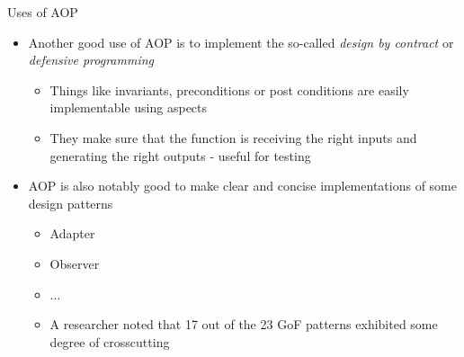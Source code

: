 \documentclass[11pt]{beamer}
\begin{document}
\begin{frame}{Uses of AOP}
\begin{itemize}
   \item Another good use of AOP is to implement the so-called \emph{design by contract} or \emph{defensive programming}
   \begin{itemize}
      \item Things like invariants, preconditions or post conditions are easily implementable using aspects
      \item They make sure that the function is receiving the right inputs and generating the right outputs - useful for testing
   \end{itemize}
   \item AOP is also notably good to make clear and concise implementations of some design patterns
      \begin{itemize}
         \item Adapter
         \item Observer
         \item ...
         \item A researcher noted that 17 out of the 23 GoF patterns exhibited some degree of crosscutting %
      \end{itemize}
\end{itemize}
\end{frame}
\end{document}
